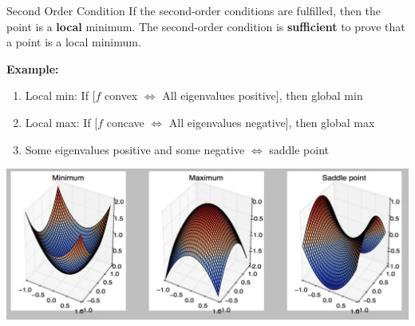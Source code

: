 \begin{vbframe}{Second Order Condition}
  If the second-order conditions are fulfilled, then the point is a \textbf{local} minimum. The second-order condition is \textbf{sufficient} to prove that a point is a local minimum. 
  
  
  

  \framebreak

\textbf{Example:}
\footnotesize
\begin{enumerate}
\item Local min: If [$f$ convex $\Leftrightarrow$ All eigenvalues positive], then global min\\
\item Local max: If [$f$ concave $\Leftrightarrow$ All eigenvalues negative], then global max\\
\item Some eigenvalues positive and some negative $\Leftrightarrow$ saddle point
\end{enumerate}

\vspace{0.5cm}

\begin{center}
\includegraphics[scale= 0.5]{figure_man/convex.jpg}
\end{center}

  
  \end{vbframe}

